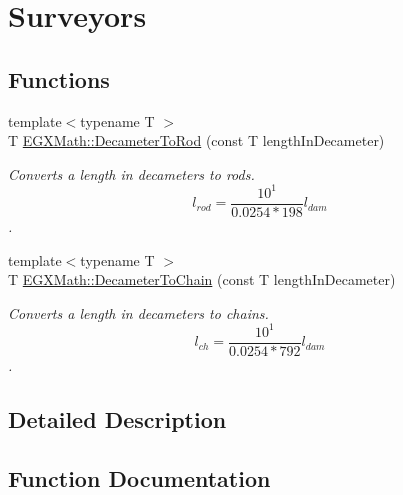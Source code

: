 \hypertarget{group___e_g_x_math-_conversions-_length_conversions-_decameter-_surveyors}{}\section{Surveyors}
\label{group___e_g_x_math-_conversions-_length_conversions-_decameter-_surveyors}
\subsection*{Functions}
\begin{DoxyCompactItemize}
\item 
{\footnotesize template$<$typename T $>$ }\\T \mbox{\hyperlink{group___e_g_x_math-_conversions-_length_conversions-_decameter-_surveyors_ga0a6de708486617662fba474b67c8faa5}{E\+G\+X\+Math\+::\+Decameter\+To\+Rod}} (const T length\+In\+Decameter)
\begin{DoxyCompactList}\small\item\em Converts a length in decameters to rods. \[ l_{rod}= \frac{10^{1}}{0.0254 * 198} l_{dam} \]. \end{DoxyCompactList}\item 
{\footnotesize template$<$typename T $>$ }\\T \mbox{\hyperlink{group___e_g_x_math-_conversions-_length_conversions-_decameter-_surveyors_ga7ede3a9605004deb5638075581637354}{E\+G\+X\+Math\+::\+Decameter\+To\+Chain}} (const T length\+In\+Decameter)
\begin{DoxyCompactList}\small\item\em Converts a length in decameters to chains. \[ l_{ch}= \frac{10^{1}}{0.0254 * 792} l_{dam} \]. \end{DoxyCompactList}\end{DoxyCompactItemize}


\subsection{Detailed Description}


\subsection{Function Documentation}
\mbox{\label{group___e_g_x_math-_conversions-_length_conversions-_decameter-_surveyors_ga7ede3a9605004deb5638075581637354}} 
